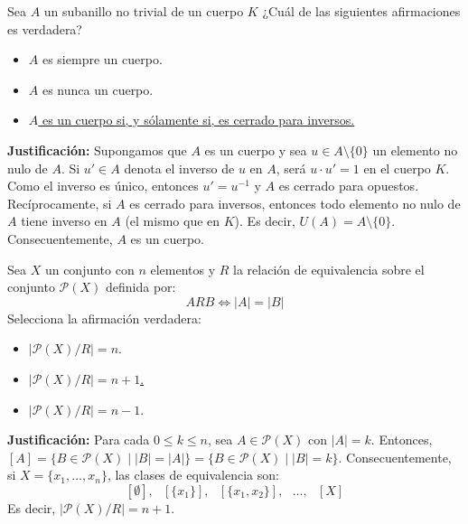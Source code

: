 \documentclass[12pt]{article}
\newcounter{ejercicio}[section] %
\newcounter{ejercicio}
\begin{document}
    \begin{ejercicio}
       Sea $A$ un subanillo no trivial de un cuerpo $K$ ¿Cuál de las siguientes afirmaciones es verdadera? 
        \begin{itemize}
            \item $A$ es siempre un cuerpo.
            \item $A$ es nunca un cuerpo.
            \item \underline{$A$ es un cuerpo si, y sólamente si, es cerrado para inversos.}
        \end{itemize}
        \textbf{Justificación:}\newline
        Supongamos que $A$ es un cuerpo y sea $u \in A\setminus \{0\}$ un elemento no nulo de $A$.\newline
        Si $u' \in A$ denota el inverso de $u$ en $A$, será $u\cdot u'=1$ en el cuerpo $K$.\newline
        Como el inverso es único, entonces $u'=u^{-1}$ y $A$ es cerrado para opuestos.\\

        \noindent
        Recíprocamente, si $A$ es cerrado para inversos, entonces todo elemento no nulo de $A$ tiene inverso en $A$ (el mismo que en $K$).\newline
        Es decir, $U(A) = A\setminus \{0\}$. Consecuentemente, $A$ es un cuerpo.
    \end{ejercicio}

    \begin{ejercicio}
        Sea $X$ un conjunto con $n$ elementos y $R$ la relación de equivalencia sobre el conjunto $\mathcal{P}(X)$ definida por:
        $$A R B \Leftrightarrow |A| = |B|$$
        Selecciona la afirmación verdadera:
        \begin{itemize}
            \item $|\mathcal{P}(X)/R| = n$.
            \item \underline{$|\mathcal{P}(X)/R| = n+1$.}
            \item $|\mathcal{P}(X)/R| = n-1$.
        \end{itemize}
        \textbf{Justificación:}\newline
        Para cada $0\leq k\leq n$, sea $A\in \mathcal{P}(X)$ con $|A|=k$.\newline
        Entonces, $[A] = \{B \in \mathcal{P}(X) \mid |B| = |A|\} = \{B \in \mathcal{P}(X) \mid |B| = k\}$.\newline
        Consecuentemente, si $X = \{x_1, \ldots, x_n\}$, las clases de equivalencia son:
        $$[\emptyset],~~~[\{x_1\}],~~~[\{x_1,x_2\}],~~~\ldots,~~~[X]$$
        Es decir, $|\mathcal{P}(X)/R| = n+1$.
    \end{ejercicio}
\end{document}
